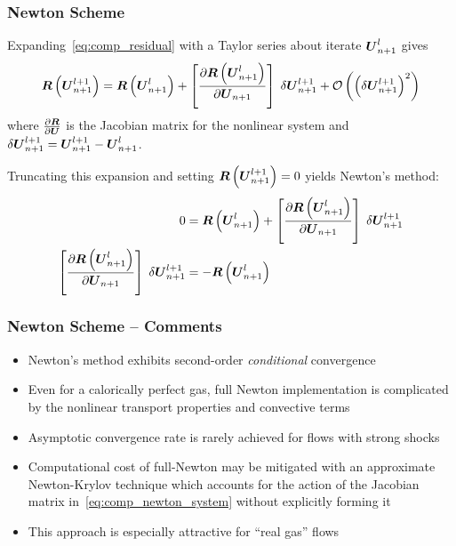 \documentclass[compress,11pt]{beamer}
\begin{document}
\frame
{
  \frametitle{\scriptsize Newton Scheme}
  \vspace{-1em}
  \footnotesize
  Expanding~\eqref{eq:comp_residual} with a Taylor series about iterate ${\boldsymbol{U}}_{n+1}^l$ gives
  \begin{equation}
    \label{eq:comp_residual_linearized}  
    {\boldsymbol{R}}\left({\boldsymbol{U}}_{n+1}^{l+1}\right) = {\boldsymbol{R}}\left({\boldsymbol{U}}_{n+1}^l\right) +\left[{\frac{\partial{{\boldsymbol{R}}\left({\boldsymbol{U}}_{n+1}^l\right)}}{\partial{{\boldsymbol{U}}_{n+1}}}}\right]\;\delta{\boldsymbol{U}}_{n+1}^{l+1} + \mathcal{O}\left(\left(\delta{\boldsymbol{U}}_{n+1}^{l+1}\right)^2\right)
  \end{equation}
  where ${\frac{\partial{{\boldsymbol{R}}}}{\partial{{\boldsymbol{U}}}}}$ is the Jacobian matrix for the nonlinear system and $\delta {\boldsymbol{U}}_{n+1}^{l+1}={\boldsymbol{U}}_{n+1}^{l+1}-{\boldsymbol{U}}_{n+1}^l$.
  \vspace{1em}
  
  {
    Truncating this expansion and setting ${\boldsymbol{R}}\left({\boldsymbol{U}}_{n+1}^{l+1}\right)=0$ yields Newton's method:
    \begin{align}
      0 &= {\boldsymbol{R}}\left({\boldsymbol{U}}_{n+1}^l\right) + \left[{\frac{\partial{{\boldsymbol{R}}\left({\boldsymbol{U}}_{n+1}^l\right)}}{\partial{{\boldsymbol{U}}_{n+1}}}}\right]\;\delta{\boldsymbol{U}}_{n+1}^{l+1} \nonumber \\
      \left[{\frac{\partial{{\boldsymbol{R}}\left({\boldsymbol{U}}_{n+1}^l\right)}}{\partial{{\boldsymbol{U}}_{n+1}}}}\right]\;\delta{\boldsymbol{U}}_{n+1}^{l+1} &= -{\boldsymbol{R}}\left({\boldsymbol{U}}_{n+1}^l\right) \label{eq:comp_newton_system}
    \end{align}
  }
}

\frame
{
  \frametitle{\scriptsize Newton Scheme -- Comments}
  \vspace{-.5em}
  
  \begin{itemize}
    \item Newton's method exhibits second-order \emph{conditional} convergence
    \item Even for a calorically perfect gas, full Newton implementation is complicated by the nonlinear transport properties and convective terms
    \item Asymptotic convergence rate is rarely achieved for flows with strong shocks
    \item Computational cost of full-Newton may be mitigated with an approximate Newton-Krylov technique which accounts for the action of the Jacobian matrix in~\eqref{eq:comp_newton_system} without explicitly forming it
    \item This approach is especially attractive for ``real gas'' flows
  \end{itemize}
}
\end{document}
